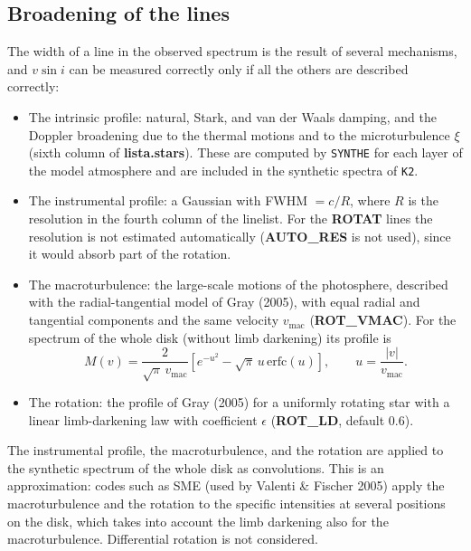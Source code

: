 \documentclass[modern]{aastex701}
\begin{document}
\subsection{Broadening of the lines}
The width of a line in the observed spectrum is the result of several mechanisms, and $v \sin i$ can be measured correctly only if all the others are described correctly:
\begin{itemize}
    \item The intrinsic profile: natural, Stark, and van der Waals damping, and the Doppler broadening due to the thermal motions and to the microturbulence $\xi$ (sixth column of {\bf lista.stars}). These are computed by \texttt{SYNTHE} for each layer of the model atmosphere and are included in the synthetic spectra of \texttt{K2}.
    \item The instrumental profile: a Gaussian with FWHM $= c/R$, where $R$ is the resolution in the fourth column of the linelist. For the {\bf ROTAT} lines the resolution is not estimated automatically ({\bf AUTO\_RES} is not used), since it would absorb part of the rotation.
    \item The macroturbulence: the large-scale motions of the photosphere, described with the radial-tangential model of Gray (2005), with equal radial and tangential components and the same velocity $v_{\mathrm{mac}}$ ({\bf ROT\_VMAC}). For the spectrum of the whole disk (without limb darkening) its profile is
    \begin{equation}
        M(v) = \frac{2}{\sqrt{\pi}\, v_{\mathrm{mac}}} \left[ e^{-u^2} - \sqrt{\pi}\, u\, \mathrm{erfc}(u) \right], \qquad u = \frac{|v|}{v_{\mathrm{mac}}}.
    \end{equation}
    \item The rotation: the profile of Gray (2005) for a uniformly rotating star with a linear limb-darkening law with coefficient $\epsilon$ ({\bf ROT\_LD}, default 0.6).
\end{itemize}
The instrumental profile, the macroturbulence, and the rotation are applied to the synthetic spectrum of the whole disk as convolutions. This is an approximation: codes such as SME (used by Valenti \& Fischer 2005) apply the macroturbulence and the rotation to the specific intensities at several positions on the disk, which takes into account the limb darkening also for the macroturbulence. Differential rotation is not considered.
\end{document}
